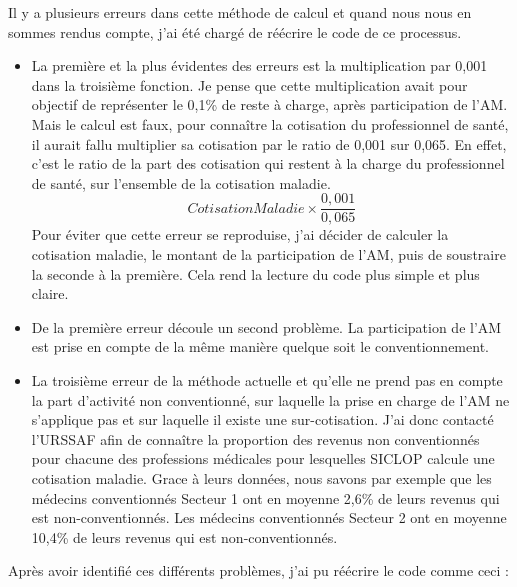 Il y a plusieurs erreurs dans cette méthode de calcul et quand nous nous en sommes rendus compte, j'ai été chargé de réécrire le code de ce processus.
\begin{itemize}
    \item La première et la plus évidentes des erreurs est la multiplication par 0,001 dans la troisième fonction.
    Je pense que cette multiplication avait pour objectif de représenter le 0,1\% de reste à charge, après participation de l'AM. Mais le calcul est faux, pour connaître la cotisation du professionnel de santé, il aurait fallu multiplier sa cotisation par le ratio de 0,001 sur 0,065. En effet, c'est le ratio de la part des cotisation qui restent à la charge du professionnel de santé, sur l'ensemble de la cotisation maladie.
    \begin{equation} Cotisation Maladie \times \frac{0{,}001}{0{,}065} \end{equation}
    Pour éviter que cette erreur se reproduise, j'ai décider de calculer la cotisation maladie, le montant de la participation de l'AM, puis de soustraire la seconde à la première. Cela rend la lecture du code plus simple et plus claire.
    \item De la première erreur découle un second problème. La participation de l'AM est prise en compte de la même manière quelque soit le conventionnement.
    \item La troisième erreur de la méthode actuelle et qu'elle ne prend pas en compte la part d'activité non conventionné, sur laquelle la prise en charge de l'AM ne s'applique pas et sur laquelle il existe une sur-cotisation. J'ai donc contacté l'URSSAF afin de connaître la proportion des revenus non conventionnés pour chacune des professions médicales pour lesquelles SICLOP calcule une cotisation maladie. Grace à leurs données, nous savons par exemple que les médecins conventionnés Secteur 1 ont en moyenne 2,6\% de leurs revenus qui est non-conventionnés. Les médecins conventionnés Secteur 2 ont en moyenne 10,4\% de leurs revenus qui est non-conventionnés.
\end{itemize}


Après avoir identifié ces différents problèmes, j'ai pu réécrire le code comme ceci :

